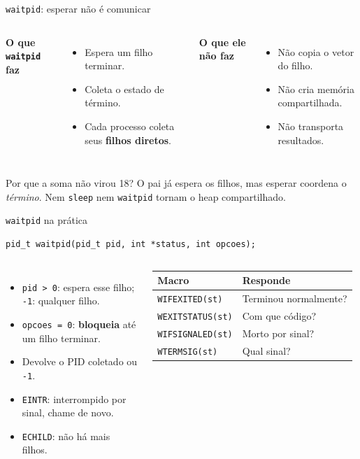 \documentclass[aspectratio=169]{beamer}
\begin{document}
\begin{frame}{\texttt{waitpid}: esperar não é comunicar}
\begin{columns}[T]
\textbf{O que \texttt{waitpid} faz}
\begin{itemize}
    \item Espera um filho terminar.
    \item Coleta o estado de término.
    \item Cada processo coleta seus \textbf{filhos diretos}.
\end{itemize}

\textbf{O que ele não faz}
\begin{itemize}
    \item Não copia o vetor do filho.
    \item Não cria memória compartilhada.
    \item Não transporta resultados.
\end{itemize}
\end{columns}

\vspace{1em}
\begin{alertblock}{Por que a soma não virou 18?}
O pai já espera os filhos, mas esperar coordena o \emph{término}. Nem \texttt{sleep} nem \texttt{waitpid} tornam o heap compartilhado.
\end{alertblock}
\end{frame}

\begin{frame}[fragile]{\texttt{waitpid} na prática}
\begin{lstlisting}[style=codigo]
pid_t waitpid(pid_t pid, int *status, int opcoes);
\end{lstlisting}

\begin{columns}[T]
\small
\begin{itemize}
    \item \texttt{pid > 0}: espera esse filho; \texttt{-1}: qualquer filho.
    \item \texttt{opcoes = 0}: \textbf{bloqueia} até um filho terminar.
    \item Devolve o PID coletado ou \texttt{-1}.
    \item \texttt{EINTR}: interrompido por sinal, chame de novo.
    \item \texttt{ECHILD}: não há mais filhos.
\end{itemize}

\small
\begin{tabular}{@{}ll@{}}
\toprule
\textbf{Macro} & \textbf{Responde} \\
\midrule
\texttt{WIFEXITED(st)} & Terminou normalmente? \\
\texttt{WEXITSTATUS(st)} & Com que código? \\
\texttt{WIFSIGNALED(st)} & Morto por sinal? \\
\texttt{WTERMSIG(st)} & Qual sinal? \\
\bottomrule
\end{tabular}
\end{columns}
\end{frame}
\end{document}
